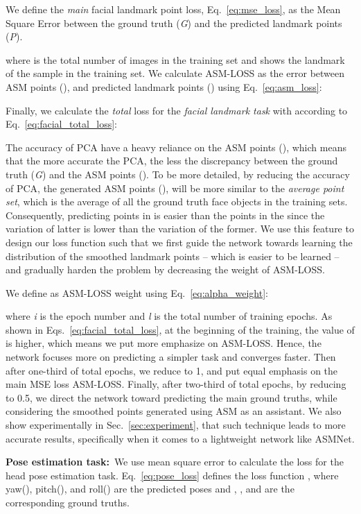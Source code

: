 \documentclass[final]{cvpr}
\begin{document}
We define the \textit{main} facial landmark point loss, Eq.~\ref{eq:mse_loss}, as the Mean Square Error between the ground truth (\textit{G}) and the predicted landmark points (\textit{P}). 

where  is the total number of images in the training set and  shows the  landmark of the  sample in the training set. We calculate ASM-LOSS as the error between ASM points (), and predicted landmark points () using Eq.~\ref{eq:asm_loss}:



Finally, we calculate the \textit{total} loss for the \textit{facial landmark task} with according to Eq.~\ref{eq:facial_total_loss}:

The accuracy of PCA have a heavy reliance on the ASM points (), which means that the more accurate the PCA, the less the discrepancy between the ground truth (\textit{G}) and the ASM points (). To be more detailed, by reducing the accuracy of PCA, the generated ASM points (), will be more similar to the \textit{average point set}, which is the average of all the ground truth face objects in the training sets. Consequently, predicting points in  is easier than the points in the  since the variation of latter is lower than the variation of the former. We use this feature to design our loss function such that we first guide the network towards learning the distribution of the smoothed landmark points -- which is easier to be learned -- and gradually harden the problem by decreasing the weight of ASM-LOSS.

We define  as ASM-LOSS weight using Eq.~\ref{eq:alpha_weight}:

where  \textit{i} is the epoch number and \textit{l} is the total number of training epochs. As shown in Eqs.~\ref{eq:facial_total_loss}, at the beginning of the training, the value of  is higher, which means we put more emphasize on ASM-LOSS. Hence, the network focuses more on predicting a simpler task and converges faster. Then after one-third of total epochs, we reduce  to 1, and put equal emphasis on the main MSE loss ASM-LOSS. Finally, after two-third of total epochs, by reducing  to 0.5, we direct the network toward predicting the main ground truths, while considering the smoothed points generated using ASM as an assistant. We also show experimentally in Sec.~\ref{sec:experiment}, that such technique leads to more accurate results, specifically when it comes to a lightweight network like ASMNet.

\textbf{Pose estimation task:}~We use mean square error to calculate the loss for the head pose estimation task. Eq.~\ref{eq:pose_loss} defines the loss function \textit{}, where yaw(\textit{}), pitch(\textit{}), and roll(\textit{}) are the predicted poses and \textit{}, \textit{}, and \textit{} are the corresponding ground truths.
\end{document}
